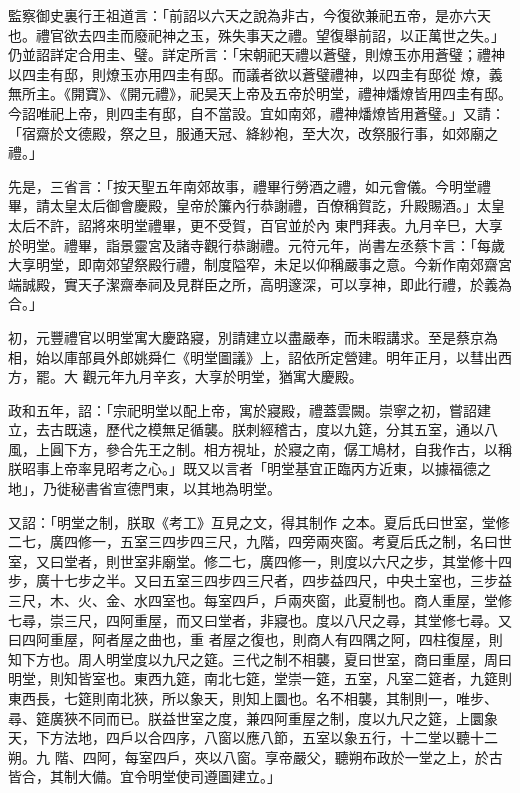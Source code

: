 \begin{pinyinscope}
 監察御史裏行王祖道言：「前詔以六天之說為非古，今復欲兼祀五帝，是亦六天也。禮官欲去四圭而廢祀神之玉，殊失事天之禮。望復舉前詔，以正萬世之失。」仍並詔詳定合用圭、璧。詳定所言：「宋朝祀天禮以蒼璧，則燎玉亦用蒼璧；禮神以四圭有邸，則燎玉亦用四圭有邸。而議者欲以蒼璧禮神，以四圭有邸從
 燎，義無所主。《開寶》、《開元禮》，祀昊天上帝及五帝於明堂，禮神燔燎皆用四圭有邸。今詔唯祀上帝，則四圭有邸，自不當設。宜如南郊，禮神燔燎皆用蒼璧。」又請：「宿齋於文德殿，祭之旦，服通天冠、絳紗袍，至大次，改祭服行事，如郊廟之禮。」



 先是，三省言：「按天聖五年南郊故事，禮畢行勞酒之禮，如元會儀。今明堂禮畢，請太皇太后御會慶殿，皇帝於簾內行恭謝禮，百僚稱賀訖，升殿賜酒。」太皇太后不許，詔將來明堂禮畢，更不受賀，百官並於內
 東門拜表。九月辛巳，大享於明堂。禮畢，詣景靈宮及諸寺觀行恭謝禮。元符元年，尚書左丞蔡卞言：「每歲大享明堂，即南郊望祭殿行禮，制度隘窄，未足以仰稱嚴事之意。今新作南郊齋宮端誠殿，實天子潔齋奉祠及見群臣之所，高明邃深，可以享神，即此行禮，於義為合。」



 初，元豐禮官以明堂寓大慶路寢，別請建立以盡嚴奉，而未暇講求。至是蔡京為相，始以庫部員外郎姚舜仁《明堂圖議》上，詔依所定營建。明年正月，以彗出西方，罷。大
 觀元年九月辛亥，大享於明堂，猶寓大慶殿。



 政和五年，詔：「宗祀明堂以配上帝，寓於寢殿，禮蓋雲闕。崇寧之初，嘗詔建立，去古既遠，歷代之模無足循襲。朕刺經稽古，度以九筵，分其五室，通以八風，上圓下方，參合先王之制。相方視址，於寢之南，僝工鳩材，自我作古，以稱朕昭事上帝率見昭考之心。」既又以言者「明堂基宜正臨丙方近東，以據福德之地」，乃徙秘書省宣德門東，以其地為明堂。



 又詔：「明堂之制，朕取《考工》互見之文，得其制作
 之本。夏后氏曰世室，堂修二七，廣四修一，五室三四步四三尺，九階，四旁兩夾窗。考夏后氏之制，名曰世室，又曰堂者，則世室非廟堂。修二七，廣四修一，則度以六尺之步，其堂修十四步，廣十七步之半。又曰五室三四步四三尺者，四步益四尺，中央土室也，三步益三尺，木、火、金、水四室也。每室四戶，戶兩夾窗，此夏制也。商人重屋，堂修七尋，崇三尺，四阿重屋，而又曰堂者，非寢也。度以八尺之尋，其堂修七尋。又曰四阿重屋，阿者屋之曲也，重
 者屋之復也，則商人有四隅之阿，四柱復屋，則知下方也。周人明堂度以九尺之筵。三代之制不相襲，夏曰世室，商曰重屋，周曰明堂，則知皆室也。東西九筵，南北七筵，堂崇一筵，五室，凡室二筵者，九筵則東西長，七筵則南北狹，所以象天，則知上圜也。名不相襲，其制則一，唯步、尋、筵廣狹不同而已。朕益世室之度，兼四阿重屋之制，度以九尺之筵，上圜象天，下方法地，四戶以合四序，八窗以應八節，五室以象五行，十二堂以聽十二朔。九
 階、四阿，每室四戶，夾以八窗。享帝嚴父，聽朔布政於一堂之上，於古皆合，其制大備。宜令明堂使司遵圖建立。」




\end{pinyinscope}
